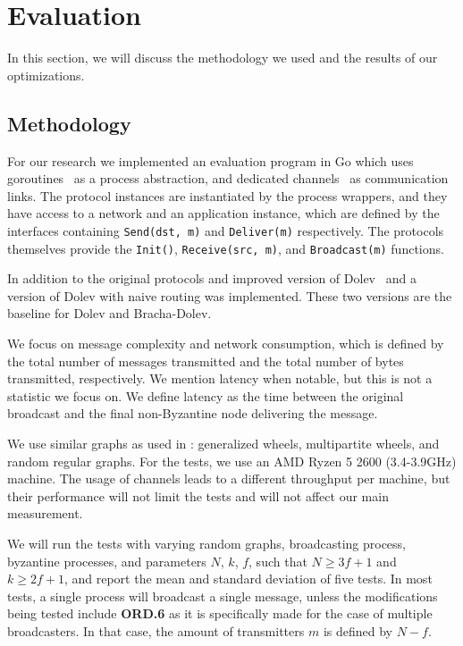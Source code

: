 \section{Evaluation}
\label{eval}
In this section, we will discuss the methodology we used and the results of our optimizations.

\subsection{Methodology}
For our research we implemented an evaluation program in Go which uses goroutines~\cite{goroutines} as a process abstraction, and dedicated channels~\cite{channels} as communication links. The protocol instances are instantiated by the process wrappers, and they have access to a network and an application instance, which are defined by the interfaces containing \texttt{Send(dst, m)} and \texttt{Deliver(m)} respectively. The protocols themselves provide the \texttt{Init()}, \texttt{Receive(src, m)}, and \texttt{Broadcast(m)} functions.

In addition to the original protocols and improved version of Dolev~\cite{bonomi2019multihop} and a version of Dolev with naive routing was implemented. These two versions are the baseline for Dolev and Bracha-Dolev. 

We focus on message complexity and network consumption, which is defined by the total number of messages transmitted and the total number of bytes transmitted, respectively. We mention latency when notable, but this is not a statistic we focus on. We define latency as the time between the original broadcast and the final non-Byzantine node delivering the message. 

We use similar graphs as used in \cite{bonomi2021practical,bonomi2019multihop}: generalized wheels, multipartite wheels, and random regular graphs. For the tests, we use an AMD Ryzen 5 2600 (3.4-3.9GHz) machine. The usage of channels leads to a different throughput per machine, but their performance will not limit the tests and will not affect our main measurement.

We will run the tests with varying random graphs, broadcasting process, byzantine processes, and parameters $N$, $k$, $f$, such that $N \ge 3f+1$ and $k \ge 2f+1$, and report the mean and standard deviation of five tests. In most tests, a single process will broadcast a single message, unless the modifications being tested include \textbf{ORD.6} as it is specifically made for the case of multiple broadcasters. In that case, the amount of transmitters $m$ is defined by $N-f$.

